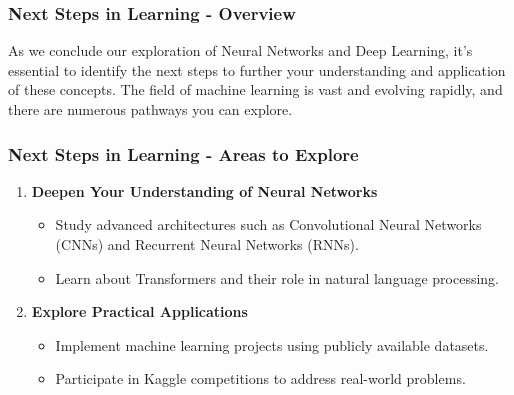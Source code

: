 \documentclass[aspectratio=169]{beamer}
\begin{document}
\begin{frame}[fragile]
    \frametitle{Next Steps in Learning - Overview}
    As we conclude our exploration of Neural Networks and Deep Learning, it's essential to identify the next steps to further your understanding and application of these concepts. The field of machine learning is vast and evolving rapidly, and there are numerous pathways you can explore.
\end{frame}

\begin{frame}[fragile]
    \frametitle{Next Steps in Learning - Areas to Explore}
    \begin{enumerate}
        \item \textbf{Deepen Your Understanding of Neural Networks}
            \begin{itemize}
                \item Study advanced architectures such as Convolutional Neural Networks (CNNs) and Recurrent Neural Networks (RNNs).
                \item Learn about Transformers and their role in natural language processing.
            \end{itemize}
            
        \item \textbf{Explore Practical Applications}
            \begin{itemize}
                \item Implement machine learning projects using publicly available datasets.
                \item Participate in Kaggle competitions to address real-world problems.
            \end{itemize}
    \end{enumerate}
\end{frame}
\end{document}
